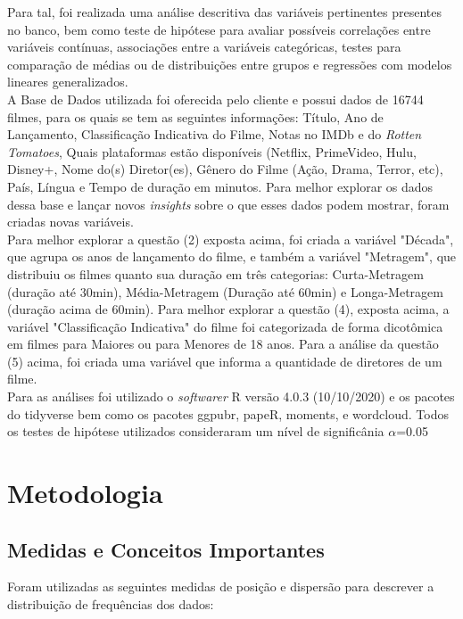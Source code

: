 \documentclass[a4paper, 12pt]{article} %
\begin{document}
Para tal, foi realizada uma análise descritiva das variáveis pertinentes presentes no banco, bem como teste de hipótese para avaliar possíveis correlações entre variáveis contínuas, associações entre a variáveis categóricas, testes para comparação de médias ou de distribuições entre grupos e regressões com modelos lineares generalizados.\\

A Base de Dados utilizada foi oferecida pelo cliente e possui dados de 16744 filmes, para os quais se tem as seguintes informações: Título, Ano de Lançamento, Classificação Indicativa do Filme, Notas no IMDb e do \emph{Rotten Tomatoes}, Quais plataformas estão disponíveis (Netflix, PrimeVideo, Hulu, Disney+, Nome do(s) Diretor(es), Gênero do Filme (Ação, Drama, Terror, etc), País, Língua e Tempo de duração em minutos. Para melhor explorar os dados dessa base e lançar novos \emph{insights} sobre o que esses dados podem mostrar, foram criadas novas variáveis.\\

Para melhor explorar a questão (2) exposta acima, foi criada a variável "Década", que agrupa os anos de lançamento do filme, e também  a variável "Metragem", que distribuiu os filmes quanto sua duração em três categorias: Curta-Metragem (duração até 30min), Média-Metragem (Duração até 60min) e Longa-Metragem (duração acima de 60min). Para  melhor explorar a questão (4), exposta acima, a variável "Classificação Indicativa" do filme foi categorizada de forma dicotômica em filmes para Maiores ou para Menores de 18 anos. Para a análise da questão (5) acima, foi criada uma variável que informa a quantidade de diretores de um filme.\\

Para as análises foi utilizado o \emph{softwarer} R versão 4.0.3 (10/10/2020) e os pacotes do tidyverse bem como os pacotes ggpubr, papeR, moments, 
e wordcloud. Todos os testes de hipótese utilizados consideraram um nível de significânia $\alpha$=0.05

\section{Metodologia}

\subsection{Medidas e Conceitos Importantes}
Foram utilizadas as seguintes medidas de posição e dispersão para descrever a distribuição de frequências dos dados:\\
\end{document}
